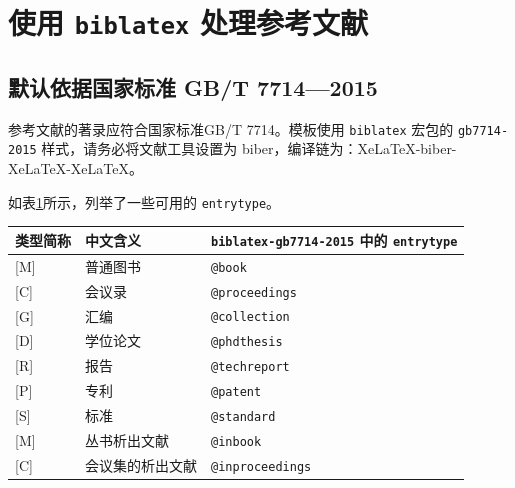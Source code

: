 \clearpage
\section{使用 \texttt{biblatex} 处理参考文献}

\subsection{默认依据国家标准 GB/T 7714—2015}

参考文献的著录应符合国家标准GB/T 7714。模板使用 \texttt{biblatex} 宏包的 \texttt{gb7714-2015} 样式，请务必将文献工具设置为 biber，编译链为：Xe\LaTeX-biber-Xe\LaTeX-Xe\LaTeX。

如表\ref{tab:atref}所示，列举了一些可用的 \verb|entrytype|。

\begin{table}[htb]
    \centering
    \label{tab:atref}
    \begin{tabular}{@{}lll@{}}
        \toprule
        \textbf{类型简称} & \textbf{中文含义} & \textbf{\texttt{biblatex-gb7714-2015} 中的 \texttt{entrytype}} \\
        \midrule
        {[M]}  & 普通图书           & \texttt{@book}\cite{book_example1,book_example2,book_example3,online_book_example1} \\
        {[C]}  & 会议录             & \texttt{@proceedings}\cite{conference_example1,conference_example2} \\
        {[G]}  & 汇编               & \texttt{@collection}\cite{collection_example1,collection_example2} \\
        {[D]}  & 学位论文           & \texttt{@phdthesis}\cite{thesis_example1,thesis_example2,thesis_example3} \\
        {[R]}  & 报告               & \texttt{@techreport}\cite{report_example1,report_example2,report_example3} \\
        {[P]}  & 专利               & \texttt{@patent}\cite{patent_example1,patent_example2} \\
        {[S]}  & 标准               & \texttt{@standard}\cite{standard_example1,standard_example2} \\
        \midrule
        {[M]}  & 丛书析出文献       & \texttt{@inbook}\cite{inbook_example1,inbook_example2} \\
        {[C]}  & 会议集的析出文献   & \texttt{@inproceedings}\cite{inconference_example1,inconference_example2} \\

\end{tabular}
\end{table}
